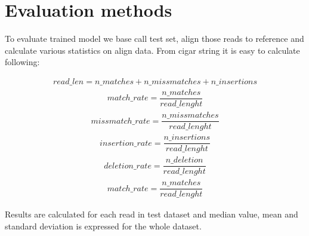 \documentclass[times, utf8, diplomski, numeric, english]{fer}
\begin{document}
\section{Evaluation methods}
To evaluate trained model we base call test set, align those reads to reference and calculate various statistics on align data.
From cigar string it is easy to calculate following:

\begin{equation}
\begin{gathered}
read\_len =  n\_matches + n\_missmatches + n\_insertions 
\end{gathered}
\end{equation}
\begin{equation}
\begin{gathered}
match\_rate = \dfrac{n\_matches}{read\_lenght}
\end{gathered}
\end{equation}
\begin{equation}
\begin{gathered}
missmatch\_rate = \dfrac{n\_missmatches}{read\_lenght}
\end{gathered}
\end{equation}
\begin{equation}
\begin{gathered}
insertion\_rate = \dfrac{n\_insertions}{read\_lenght}
\end{gathered}
\end{equation}
\begin{equation}
\begin{gathered}
deletion\_rate = \dfrac{n\_deletion}{read\_lenght}
\end{gathered}
\end{equation}
\begin{equation}
\begin{gathered}
match\_rate = \dfrac{n\_matches}{read\_lenght}
\end{gathered}
\end{equation}

Results are calculated for each read in test dataset and median value, mean and standard deviation is expressed for the whole dataset.
\end{document}
